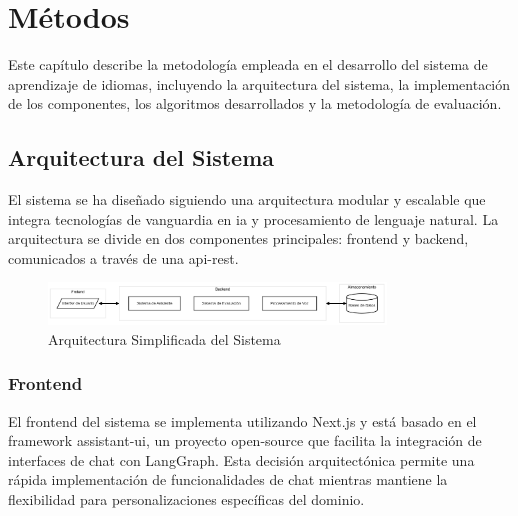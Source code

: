 \chapter{Métodos}
\label{metodos}

Este capítulo describe la metodología empleada en el desarrollo del sistema de aprendizaje de idiomas, incluyendo la arquitectura del sistema, la implementación de los componentes, los algoritmos desarrollados y la metodología de evaluación.

\section{Arquitectura del Sistema}
\label{arquitectura-sistema}

El sistema se ha diseñado siguiendo una arquitectura modular y escalable que integra tecnologías de vanguardia en \gls{ia} y procesamiento de lenguaje natural. La arquitectura se divide en dos componentes principales: frontend y backend, comunicados a través de una \gls{api-rest}.

\begin{figure}[H]
	\centering
	\includegraphics[width=0.8\textwidth]{figuras/system-overview.png}
	\caption{Arquitectura Simplificada del Sistema}
	\label{fig:arquitectura-sistema}
\end{figure}


\subsection{Frontend}
\label{frontend}

El frontend del sistema se implementa utilizando Next.js y está basado en el framework \gls{assistant-ui}, un proyecto \gls{open-source} que facilita la integración de interfaces de chat con LangGraph. Esta decisión arquitectónica permite una rápida implementación de funcionalidades de chat mientras mantiene la flexibilidad para personalizaciones específicas del dominio.

